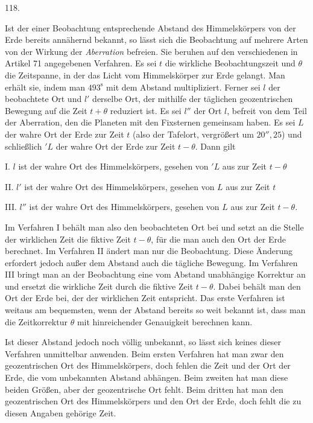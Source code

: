 \par\medskip
\begin{center}\hypertarget{native-164-article118}{}118.\end{center}
Ist der einer Beobachtung entsprechende Abstand des Himmelskörpers von der Erde bereits annähernd bekannt, so lässt sich die Beobachtung auf mehrere Arten von der Wirkung der \emph{Aberration} befreien. Sie beruhen auf den verschiedenen in Artikel 71 angegebenen Verfahren. Es sei $t$ die wirkliche Beobachtungszeit und $\theta$ die Zeitspanne, in der das Licht vom Himmelskörper zur Erde gelangt. Man erhält sie, indem man $493^{\mathrm{s}}$ mit dem Abstand multipliziert. Ferner sei $l$ der beobachtete Ort und $l'$ derselbe Ort, der mithilfe der täglichen geozentrischen Bewegung auf die Zeit $t+\theta$ reduziert ist. Es sei $l''$ der Ort $l$, befreit von dem Teil der Aberration, den die Planeten mit den Fixsternen gemeinsam haben. Es sei $L$ der wahre Ort der Erde zur Zeit $t$ (also der Tafelort, vergrößert um $20''{,}25$) und schließlich ${}'L$ der wahre Ort der Erde zur Zeit $t-\theta$. Dann gilt
\par I. $l$ ist der wahre Ort des Himmelskörpers, gesehen von ${}'L$ aus zur Zeit $t-\theta$
\par II. $l'$ ist der wahre Ort des Himmelskörpers, gesehen von $L$ aus zur Zeit $t$
\par III. $l''$ ist der wahre Ort des Himmelskörpers, gesehen von $L$ aus zur Zeit $t-\theta$.
\par\noindent Im Verfahren I behält man also den beobachteten Ort bei und setzt an die Stelle der wirklichen Zeit die fiktive Zeit $t-\theta$, für die man auch den Ort der Erde berechnet. Im Verfahren II ändert man nur die Beobachtung. Diese Änderung erfordert jedoch außer dem Abstand auch die tägliche Bewegung. Im Verfahren III bringt man an der Beobachtung eine vom Abstand unabhängige Korrektur an und ersetzt die wirkliche Zeit durch die fiktive Zeit $t-\theta$. Dabei behält man den Ort der Erde bei, der der wirklichen Zeit entspricht. Das erste Verfahren ist weitaus am bequemsten, wenn der Abstand bereits so weit bekannt ist, dass man die Zeitkorrektur $\theta$ mit hinreichender Genauigkeit berechnen kann.

Ist dieser Abstand jedoch noch völlig unbekannt, so lässt sich keines dieser Verfahren unmittelbar anwenden. Beim ersten Verfahren hat man zwar den geozentrischen Ort des Himmelskörpers, doch fehlen die Zeit und der Ort der Erde, die vom unbekannten Abstand abhängen. Beim zweiten hat man diese beiden Größen, aber der geozentrische Ort fehlt. Beim dritten hat man den geozentrischen Ort des Himmelskörpers und den Ort der Erde, doch fehlt die zu diesen Angaben gehörige Zeit.

